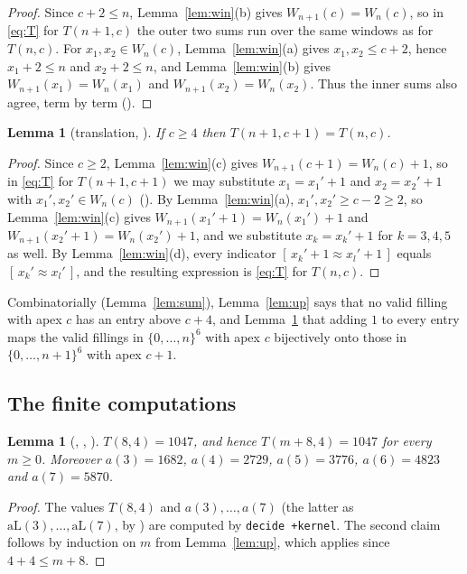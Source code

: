 \documentclass[11pt]{amsart}
\theoremstyle{plain}
\newtheorem{lemma}[theorem]{Lemma}
\theoremstyle{definition}
\newcommand{\nr}{\approx}
\newcommand{\ind}[1]{[\,#1\,]}
\begin{document}
\begin{proof}
Since $c+2\le n$, Lemma~\ref{lem:win}(b) gives $W_{n+1}(c)=W_n(c)$, so in \eqref{eq:T} for $T(n+1,c)$ the outer two sums run over the same windows as for $T(n,c)$. For $x_1,x_2\in W_n(c)$, Lemma~\ref{lem:win}(a) gives $x_1,x_2\le c+2$, hence $x_1+2\le n$ and $x_2+2\le n$, and Lemma~\ref{lem:win}(b) gives $W_{n+1}(x_1)=W_n(x_1)$ and $W_{n+1}(x_2)=W_n(x_2)$. Thus the inner sums also agree, term by term ().
\end{proof}

\begin{lemma}[translation, ]\label{lem:shift}
If $c\ge4$ then $T(n+1,c+1)=T(n,c)$.
\end{lemma}

\begin{proof}
Since $c\ge2$, Lemma~\ref{lem:win}(c) gives $W_{n+1}(c+1)=W_n(c)+1$, so in \eqref{eq:T} for $T(n+1,c+1)$ we may substitute $x_1=x_1'+1$ and $x_2=x_2'+1$ with $x_1',x_2'\in W_n(c)$ (). By Lemma~\ref{lem:win}(a), $x_1',x_2'\ge c-2\ge2$, so Lemma~\ref{lem:win}(c) gives $W_{n+1}(x_1'+1)=W_n(x_1')+1$ and $W_{n+1}(x_2'+1)=W_n(x_2')+1$, and we substitute $x_k=x_k'+1$ for $k=3,4,5$ as well. By Lemma~\ref{lem:win}(d), every indicator $\ind{x_k'+1\nr x_l'+1}$ equals $\ind{x_k'\nr x_l'}$, and the resulting expression is \eqref{eq:T} for $T(n,c)$.
\end{proof}

Combinatorially (Lemma~\ref{lem:sum}), Lemma~\ref{lem:up} says that no valid filling with apex $c$ has an entry above $c+4$, and Lemma~\ref{lem:shift} that adding $1$ to every entry maps the valid fillings in $\{0,\dots,n\}^6$ with apex $c$ bijectively onto those in $\{0,\dots,n+1\}^6$ with apex $c+1$.

\subsection{The finite computations}

\begin{lemma}[, , ]\label{lem:comp}
$T(8,4)=1047$, and hence $T(m+8,4)=1047$ for every $m\ge0$. Moreover $a(3)=1682$, $a(4)=2729$, $a(5)=3776$, $a(6)=4823$ and $a(7)=5870$.
\end{lemma}

\begin{proof}
The values $T(8,4)$ and $a(3),\dots,a(7)$ (the latter as $\mathrm{aL}(3),\dots,\mathrm{aL}(7)$, by ) are computed by \texttt{decide +kernel}. The second claim follows by induction on $m$ from Lemma~\ref{lem:up}, which applies since $4+4\le m+8$.
\end{proof}
\end{document}
